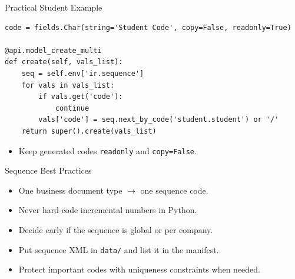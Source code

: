 \begin{frame}[fragile]{Practical Student Example}
\begin{lstlisting}
code = fields.Char(string='Student Code', copy=False, readonly=True)

@api.model_create_multi
def create(self, vals_list):
	seq = self.env['ir.sequence']
	for vals in vals_list:
		if vals.get('code'):
			continue
		vals['code'] = seq.next_by_code('student.student') or '/'
	return super().create(vals_list)
\end{lstlisting}
	\begin{itemize}
		\item Keep generated codes \texttt{readonly} and \texttt{copy=False}.
	\end{itemize}
\end{frame}

\begin{frame}{Sequence Best Practices}
	\begin{itemize}
		\item One business document type $\rightarrow$ one sequence code.
		\item Never hard-code incremental numbers in Python.
		\item Decide early if the sequence is global or per company.
		\item Put sequence XML in \texttt{data/} and list it in the manifest.
		\item Protect important codes with uniqueness constraints when needed.
	\end{itemize}
\end{frame}
